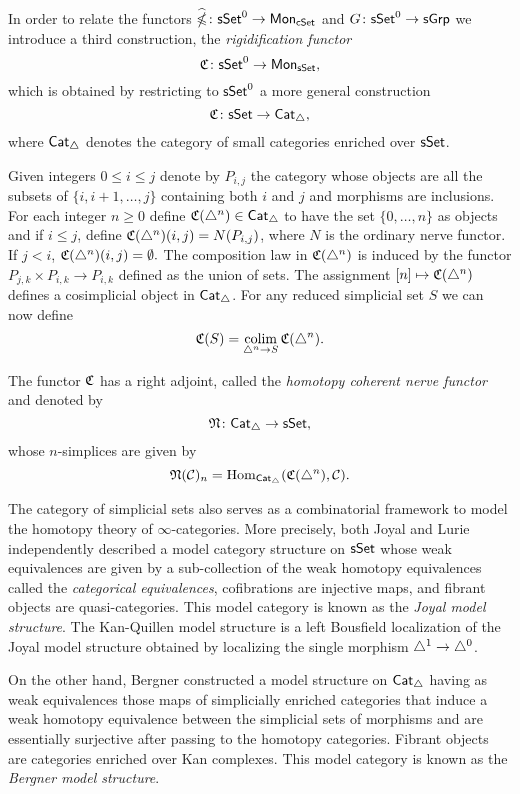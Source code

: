In order to relate the functors $\widehat{\operatorname{\mathbb{\Omega}}} \colon \mathsf{sSet}^0 \to \mathsf{Mon}_{\mathsf{cSet}}$ and $G \colon \mathsf{sSet}^0\to \mathsf{sGrp}$ we introduce a third construction, the \textit{rigidification functor}
$$\operatorname{\mathfrak{C}} \colon \mathsf{sSet}^0 \to \mathsf{Mon}_{\mathsf{sSet}},$$
which is obtained by restricting to $\mathsf{sSet}^0$ a more general construction
$$\operatorname{\mathfrak{C}} \colon \mathsf{sSet} \to \mathsf{Cat}_{\triangle},$$
where $\mathsf{Cat}_{\triangle}$ denotes the category of small categories enriched over $\mathsf{sSet}$.

Given integers $0 \leq  i \leq j$ denote by $P_{i,j}$ the category whose objects are all the subsets of $\{i, i+1, \dots, j\}$ containing both $i$ and $j$ and morphisms are inclusions.
For each integer $n \geq 0$ define $\operatorname{\mathfrak{C}}(\triangle^n) \in \mathsf{Cat}_{\triangle}$ to have the set $\{0, \dots, n\}$ as objects and if $i \leq j$, define $\operatorname{\mathfrak{C}}(\triangle^n)(i,j)= N(P_{i,j})$, where $N$ is the ordinary nerve functor.
If $j < i$, $\operatorname{\mathfrak{C}}(\triangle^n)(i,j) = \emptyset.$ The composition law in $\operatorname{\mathfrak{C}}(\triangle^n)$ is induced by the functor $P_{j,k} \times P_{i,k} \to P_{i,k}$ defined as the union of sets.
The assignment $[n] \mapsto \operatorname{\mathfrak{C}}(\triangle^n)$ defines a cosimplicial object in $\mathsf{Cat}_{\triangle}$.
For any reduced simplicial set $S$ we can now define
\begin{equation*}
\operatorname{\mathfrak{C}}(S) = \operatorname*{colim}_{\triangle^n \to S} \operatorname{\mathfrak{C}}(\triangle^n).
\end{equation*}

The functor $\operatorname{\mathfrak{C}}$ has a right adjoint, called the \textit{homotopy coherent nerve functor} and denoted by
$$\operatorname{\mathfrak{N}} \colon \mathsf{Cat}_{\triangle} \to \mathsf{sSet},$$
whose $n$-simplices are given by 
$$\operatorname{\mathfrak{N}}(\mathcal{C})_n = \mathrm{Hom}_{\mathsf{Cat}_{\triangle}}(\operatorname{\mathfrak{C}}(\triangle^n), \mathcal{C}).$$

The category of simplicial sets also serves as a combinatorial framework to model the homotopy theory of $\infty$-categories.
More precisely, both Joyal and Lurie independently described a model category structure on $\mathsf{sSet}$ whose weak equivalences are given by a sub-collection of the weak homotopy equivalences called the \textit{categorical equivalences}, cofibrations are injective maps, and fibrant objects are quasi-categories.
This model category is known as the \textit{Joyal model structure}.
The Kan-Quillen model structure is a left Bousfield localization of the Joyal model structure obtained by localizing the single morphism $\triangle^1 \to \triangle^0$.

On the other hand, Bergner constructed a model structure on $\mathsf{Cat}_{\triangle}$ having as weak equivalences those maps of simplicially enriched categories that induce a weak homotopy equivalence between the simplicial sets of morphisms and are essentially surjective after passing to the homotopy categories.
Fibrant objects are categories enriched over Kan complexes.
This model category is known as the \textit{Bergner model structure}.

